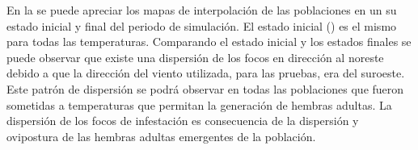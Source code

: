 En la  se puede apreciar los mapas de interpolación de las
poblaciones en un su estado inicial y final del periodo de simulación. El estado inicial
() es el mismo para todas las temperaturas. Comparando el estado
inicial y los estados finales se puede observar que existe una dispersión de los focos en
dirección al noreste debido a que la dirección del viento utilizada, para las pruebas, era del
suroeste. Este patrón de dispersión se podrá observar en todas las poblaciones que fueron
sometidas a temperaturas que permitan la generación de hembras adultas. La dispersión de los focos
de infestación es consecuencia de la dispersión y ovipostura de las hembras adultas emergentes de
la población.
